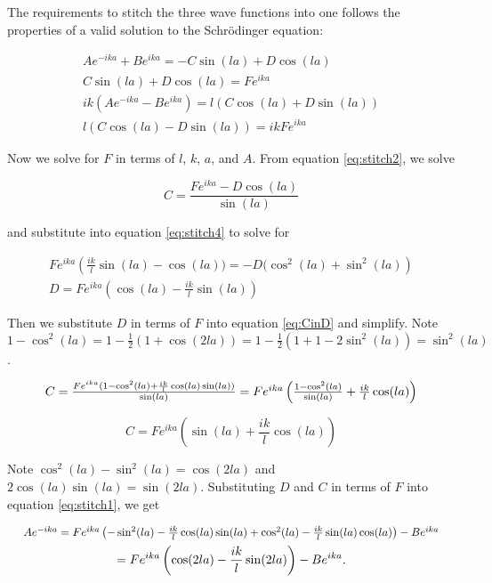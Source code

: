The requirements to stitch the three wave functions into one follows the
properties of a valid solution to the Schrödinger equation:

\begin{gather}
    Ae^{-ika} + Be^{ika} = -C\sin(la) + D\cos(la) \label{eq:stitch1} \\
    C\sin(la) + D\cos(la) = Fe^{ika} \label{eq:stitch2} \\
    ik(Ae^{-ika} - Be^{ika}) = l(C\cos(la) + D\sin(la)) \label{eq:stitch3} \\
    l(C\cos(la) - D\sin(la)) = ikFe^{ika} \label{eq:stitch4}
\end{gather}

Now we solve for $F$ in terms of $l$, $k$, $a$, and $A$. From equation
\eqref{eq:stitch2}, we solve

\begin{equation}
    C = \frac{Fe^{ika} - D\cos(la)}{\sin(la)} \label{eq:CinD}
\end{equation}

and substitute into equation \eqref{eq:stitch4} to solve for

\begin{gather*}
    Fe^{ika}
    \left(
    \frac{ik}{l}\sin(la) - \cos(la)) = -D(\cos^2(la) + \sin^2(la)
    \right)
    \\
    D = Fe^{ika}
    \left(
    \cos(la) - \frac{ik}{l}\sin(la)
    \right)
\end{gather*}

Then we substitute $D$ in terms of $F$ into equation \eqref{eq:CinD} and
simplify. Note $1 - \cos^2(la) = 1 - \frac{1}{2}(1 + \cos(2la)) = 1 -
\frac{1}{2}(1 + 1 - 2\sin^2(la)) = \sin^2(la)$.

\[
    \scalebox{1}{$
    C
    = \frac{Fe^{ika}(1 - \cos^2(la) +
    \frac{ik}{l}\cos(la)\sin(la))}{\sin(la)}
    = Fe^{ika}
    \left(
    \frac{1 - \cos^2(la)}{\sin(la)} + \frac{ik}{l}\cos(la)
    \right)
    $}
\]

\[
    C = Fe^{ika}
    \left(
    \sin(la) + \frac{ik}{l}\cos(la)
    \right)
\]

Note $\cos^2(la) - \sin^2(la) = \cos(2la)$ and $2\cos(la)\sin(la) =
\sin(2la)$. Substituting $D$ and $C$ in terms of $F$ into equation
\eqref{eq:stitch1}, we get

\begin{gather}
    \scalebox{0.9}{$
    Ae^{-ika}
    = Fe^{ika}
    \left(
    -\sin^2(la) - \frac{ik}{l}\cos(la)\sin(la) + \cos^2(la)
    - \frac{ik}{l}\sin(la)\cos(la)
    \right)
    - Be^{ika}
    \nonumber
    $}
    \\
    = Fe^{ika}
    \left(
    \cos(2la) - \frac{ik}{l}\sin(2la)
    \right)
    - Be^{ika}. \label{eq:AinFB}
\end{gather}

